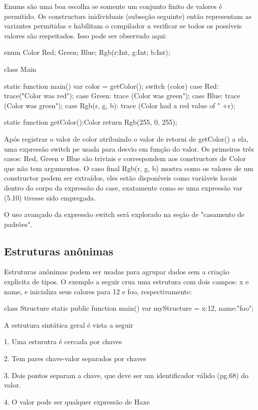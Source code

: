 {{Enums são uma boa escolha se somente um conjunto finito de valores é permitido. Os constructors inidividuais (subseção seguinte) então representam as variantes permitidas e habilitam o compilador a verificar se todos os possíveis valores são respeitados. Isso pode ser observado aqui:

enum Color {
Red;
Green;
Blue;
Rgb(r:Int, g:Int; b:Int);
}

class Main { 
   static function main() {
      var color = getColor();
      switch (color) {
         case Red: trace("Color was red");
         case Green: trace (Color was green");
         case Blue: trace (Color was green");
         case Rgb(r, g, b):
              trace (Color had a red value of " +r);
      }
}

static function getColor():Color{
   return Rgb(255, 0, 255);
}

Após registrar o valor de color atribuindo o valor de retorni de getColor() a ela, uma expressão switch pe usada para desvio em função do valor. Os primeiros três casos: Red, Green e Blue  são triviais e correspondem  aos constructors de Color que não tem argumentos. O caso final Rgb(r, g, b) mostra como os valores de um constructor podem ser extraídos, eles estão disponíveis como variáveis locais dentro do corpo da expressão do case, exatamente como se uma expressão var (5.10) tivesse sido empregada.

O uso avançado da expressão switch será explorado na seção de "casamento de padrões".

\subsection{Estruturas anônimas}

Estruturas anônimas podem ser usadas para agrupar dados sem a criação explicita de tipos. O exemplo a seguir  crua uma estrutura com dois campos: x e name, e inicializa seus calores para 12 e foo, respectivamente:

class Structure {
  static public function main() {
     var myStructure = {x:12, name:"foo"};
  }
}

A estrutura sintática geral é vista a seguir

1. Uma esturutra é cercada por chaves

2. Tem pares chave-valor separados por chaves

3. Dois pontos separam a chave, que deve ser um identificador válido (pg.68) do valor.

4. O valor pode ser qualquer expressão de Haxe

}}}
